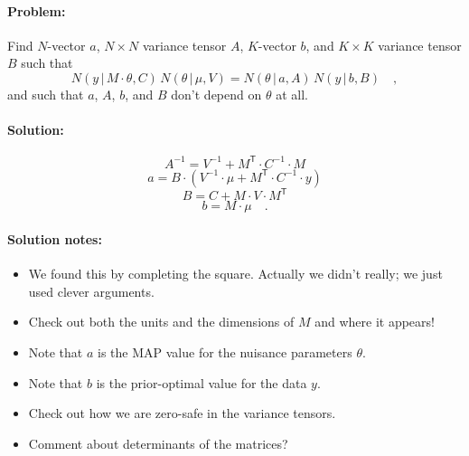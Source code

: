 \documentclass[12pt, letterpaper]{article}
\newcommand{\given}{\,|\,}
\newcommand{\T}{^{\!\mathsf{T}}}
\newcommand{\inv}{^{-1}}
\begin{document}
\paragraph{Problem:}
Find $N$-vector $a$, $N\times N$ variance tensor $A$, $K$-vector $b$,
and $K\times K$ variance tensor $B$ such that
\begin{equation}
N(y\given M\cdot\theta, C)\,N(\theta\given\mu, V)
 = N(\theta\given a, A)\,N(y\given b, B) \quad ,
\end{equation}
and such that $a$, $A$, $b$, and $B$ don't depend on $\theta$ at all.

\paragraph{Solution:}
\begin{equation}
A\inv = V\inv + M\T \cdot C\inv \cdot M
\end{equation}
\begin{equation}
a = B \cdot (V\inv \cdot \mu + M\T \cdot C\inv \cdot y)
\end{equation}
\begin{equation}
B = C + M \cdot V \cdot M\T
\end{equation}
\begin{equation}
b = M \cdot \mu
\quad .
\end{equation}

\paragraph{Solution notes:}
\begin{itemize}
\item
We found this by completing the square. Actually we didn't really; we just
used clever arguments.
\item
Check out both the units and the dimensions of $M$ and where it appears!
\item
Note that $a$ is the MAP value for the nuisance parameters $\theta$.
\item
Note that $b$ is the prior-optimal value for the data $y$.
\item
Check out how we are zero-safe in the variance tensors.
\item
Comment about determinants of the matrices?
\end{itemize}
\end{document}
